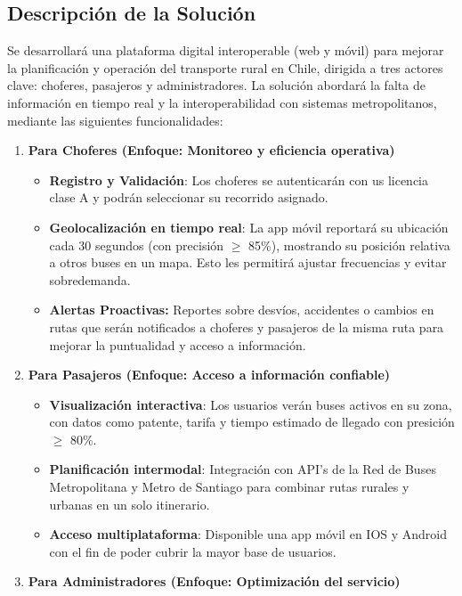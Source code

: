 \documentclass[12pt]{article}
\begin{document}
\subsection{Descripción de la Solución}
Se desarrollará una plataforma digital interoperable (web y móvil) para mejorar la planificación y operación del transporte rural en Chile, dirigida a tres actores clave: choferes, pasajeros y administradores. La solución abordará la falta de información en tiempo real y la interoperabilidad con sistemas metropolitanos, mediante las siguientes funcionalidades:
\begin{enumerate}
    \item \textbf{Para Choferes (Enfoque: Monitoreo y eficiencia operativa)}
    \begin{itemize}
        \item \textbf{Registro y Validación}: Los choferes se autenticarán con us licencia clase A y podrán seleccionar su recorrido asignado.
        \item \textbf{Geolocalización en tiempo real}: La app móvil reportará su ubicación cada 30 segundos (con precisión $\geq$ 85\%), mostrando su posición relativa a otros buses en un mapa. Esto les permitirá ajustar frecuencias y evitar sobredemanda.
        \item \textbf{Alertas Proactivas:} Reportes sobre desvíos, accidentes o cambios en rutas que serán notificados a choferes y pasajeros de la misma ruta para mejorar la puntualidad y acceso a información.
    \end{itemize}
    \item \textbf{Para Pasajeros (Enfoque: Acceso a información confiable)}
    \begin{itemize}
        \item \textbf{Visualización interactiva}: Los usuarios verán buses activos en su zona, con datos como patente, tarifa y tiempo estimado de llegado con presición $\geq$ 80\%.
        \item \textbf{Planificación intermodal}: Integración con API's de la Red de Buses Metropolitana y Metro de Santiago para combinar rutas rurales y urbanas en un solo itinerario.
        \item \textbf{Acceso multiplataforma}: Disponible una app móvil en IOS y Android con el fin de poder cubrir la mayor base de usuarios.
    \end{itemize}
    \item \textbf{Para Administradores (Enfoque: Optimización del servicio)}
    \begin{itemize}

\end{itemize}
\end{enumerate}
\end{document}
